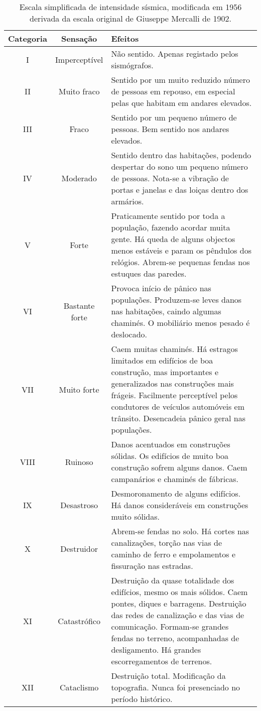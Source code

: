\begin{table}[H]
\begin{center}
\begin{scriptsize}
\noindent\begin{tabular}{c|c|p{12cm}}
\hline
Categoria  	& Sensação & Efeitos \\
\hline
I 			&	Imperceptível 	&	Não sentido. Apenas registado pelos sismógrafos.
\\II 		&	Muito fraco 	&	Sentido por um muito reduzido número de pessoas em 
								repouso, em especial pelas que habitam em andares
								elevados.
\\III 		&	Fraco 			&	Sentido por um pequeno número de pessoas. Bem sentido nos andares elevados.
\\IV 		&	Moderado 		&	Sentido dentro das habitações, podendo despertar do sono um pequeno número de pessoas. 
								Nota-se a vibração de
								portas e janelas e das loiças dentro dos armários.
\\V 		&	Forte 			&	Praticamente sentido por toda a população, fazendo acordar muita gente. 
								Há queda de alguns objectos menos estáveis e param os pêndulos dos relógios. 
								Abrem-se pequenas fendas nos estuques das paredes.
\\VI 		&	Bastante forte 	&	Provoca início de pânico nas populações. Produzem-se leves danos nas habitações, 
								caindo algumas chaminés. O mobiliário menos pesado é deslocado.
\\VII 		&	Muito forte 	&	Caem muitas chaminés. Há estragos limitados em edifícios de boa construção, 
								mas importantes e generalizados nas construções mais frágeis. 
								Facilmente perceptível pelos condutores de veículos automóveis em trânsito. 
								Desencadeia pânico geral nas populações.
\\VIII 		&	Ruinoso  		&	Danos acentuados em construções sólidas. Os edifícios de muito boa construção 
								sofrem alguns danos. Caem campanários e chaminés de fábricas.
\\IX 		&	Desastroso 		&	Desmoronamento de alguns edifícios. Há danos consideráveis em construções muito sólidas.
\\X 		&	Destruidor 		&	Abrem-se fendas no solo. Há cortes nas canalizações, torção nas vias de caminho 
								de ferro e empolamentos e fissuração nas estradas.
\\XI 		&	Catastrófico 	&	Destruição da quase totalidade dos edifícios, mesmo os mais sólidos. 
								Caem pontes, diques e barragens. Destruição das redes de canalização e das vias de comunicação. 
								Formam-se grandes fendas no terreno, acompanhadas de desligamento. Há grandes escorregamentos de terrenos.
\\XII 		&	Cataclismo 		&	Destruição total. Modificação da topografia. Nunca foi presenciado no período histórico. \\
\hline
\end{tabular}
\caption{Escala simplificada de intensidade sísmica, 
modificada em 1956 derivada da escala original de Giuseppe Mercalli de 1902.}
\label{tab:mercalli}
\end{scriptsize}
\end{center}
\end{table}

